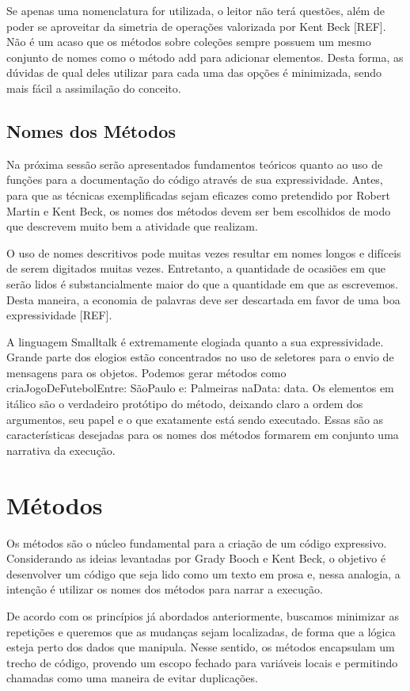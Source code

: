 Se apenas uma nomenclatura for utilizada, o leitor não terá questões, além de poder se aproveitar da simetria de operações valorizada por Kent Beck [REF]. Não é um acaso que os métodos sobre coleções sempre possuem um mesmo conjunto de nomes como o método add para adicionar elementos. Desta forma, as dúvidas de qual deles utilizar para cada uma das opções é minimizada, sendo mais fácil a assimilação do conceito.

\subsection{Nomes dos Métodos}
Na próxima sessão serão apresentados fundamentos teóricos quanto ao uso de funções para a documentação do código através de sua expressividade. Antes, para que as técnicas exemplificadas sejam eficazes como pretendido por Robert Martin e Kent Beck, os nomes dos métodos devem ser bem escolhidos de modo que descrevem muito bem a atividade que realizam.
	
O uso de nomes descritivos pode muitas vezes resultar em nomes longos e difíceis de serem digitados muitas vezes. Entretanto, a quantidade de ocasiões em que serão lidos é substancialmente maior do que a quantidade em que as escrevemos. Desta maneira, a economia de palavras deve ser descartada em favor de uma boa expressividade [REF].
	
A linguagem Smalltalk é extremamente elogiada quanto a sua expressividade. Grande parte dos elogios estão concentrados no uso de seletores para o envio de mensagens para os objetos. Podemos gerar métodos como criaJogoDeFutebolEntre: SãoPaulo e: Palmeiras naData: data. Os elementos em itálico são o verdadeiro protótipo do método, deixando claro a ordem dos argumentos, seu papel e o que exatamente está sendo executado. Essas são as características desejadas para os nomes dos métodos formarem em conjunto uma narrativa da execução.

\section{Métodos}
\label{sec:metodos}

Os métodos são o núcleo fundamental para a criação de um código expressivo. Considerando as ideias levantadas por Grady Booch e Kent Beck, o objetivo é desenvolver um código que seja lido como um texto em prosa e, nessa analogia, a intenção é utilizar os nomes dos métodos para narrar a execução.
	
De acordo com os princípios já abordados anteriormente, buscamos minimizar as repetições e queremos que as mudanças sejam localizadas, de forma que a lógica esteja perto dos dados que manipula. Nesse sentido, os métodos encapsulam um trecho de código, provendo um escopo fechado para variáveis locais e permitindo chamadas como uma maneira de evitar duplicações.

